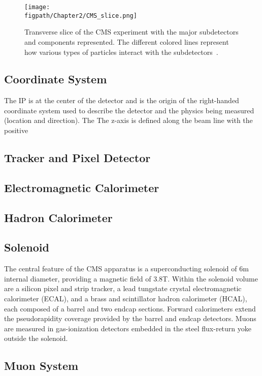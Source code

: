 \begin{figure}[!hbt]
	\centering
	\texttt{[image: \\figpath/Chapter2/CMS\_slice.png]}
	\caption{Transverse slice of the CMS experiment with the major subdetectors and components represented. The different colored lines represent how various types of particles interact with the subdetectors~\cite{CMSSlice}.}
	\label{fig:CMS_transverse}
\end{figure}

\subsection{Coordinate System}

The IP is at the center of the detector and is the origin of the right-handed coordinate system used to describe the detector and the physics being measured (location and direction). The The z-axis is defined along the beam line with the positive 


\subsection{Tracker and Pixel Detector}
\label{sec:tracker_and_pixel}
\subsection{Electromagnetic Calorimeter}
\subsection{Hadron Calorimeter}
\label{sec:hadron_calorimeter}
\subsection{Solenoid}

The central feature of the CMS apparatus is a superconducting solenoid of 6\unit{m} internal diameter, providing a magnetic field of 3.8\unit{T}. Within the solenoid volume are a silicon pixel and strip tracker, a lead tungstate crystal electromagnetic calorimeter (ECAL), and a brass and scintillator hadron calorimeter (HCAL), each composed of a barrel and two endcap sections. Forward calorimeters extend the pseudorapidity coverage provided by the barrel and endcap detectors. Muons are measured in gas-ionization detectors embedded in the steel flux-return yoke outside the solenoid. 

\subsection{Muon System}
